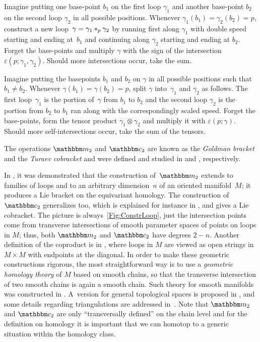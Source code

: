 \documentclass[\MainFolder/Text.tex]{subfiles}
\begin{document}
\begin{description}[leftmargin=*]
 \item[$\StringOp_2$:] Imagine putting one base-point $b_1$ on the first loop $\gamma_1$ and another base-point $b_2$ on the second loop $\gamma_2$ in all possible positions. Whenever $\gamma_1(b_1) = \gamma_2(b_2) = p$, construct a new loop~$\gamma = \gamma_1 *_p \gamma_2$ by running first along $\gamma_1$ with double speed starting and ending at~$b_1$ and continuing along $\gamma_2$ starting and ending at $b_2$. Forget the base-points and multiply $\gamma$ with the sign of the intersection $\varepsilon(p;\gamma_1, \gamma_2)$. Should more intersections occur, take the sum.
 \item[$\StringCoOp_2$:] Imagine putting the basepoints $b_1$ and $b_2$ on $\gamma$ in all possible positions such that $b_1 \neq b_2$. Whenever $\gamma(b_1) = \gamma(b_2)=p$, split $\gamma$ into~$\gamma_1$ and $\gamma_2$ as follows. The first loop~$\gamma_1$ is the portion of~$\gamma$ from $b_1$ to $b_2$ and the second loop $\gamma_2$ is the portion from $b_2$ to $b_1$ ran along with the correspondingly scaled speed. Forget the base-points, form the tensor product $\gamma_1 \otimes \gamma_2$ and multiply it with $\varepsilon(p; \gamma)$. Should more self-intersections occur, take the sum of the tensors.
\end{description}
The operations $\StringOp_2$ and $\StringCoOp_2$ are known as the \emph{Goldman bracket} and the \emph{Turaev cobracket} and were defined and studied in \cite{Goldman1986} and \cite{Turaev1991}, respectively.

In \cite{Sullivan1999}, it was demonstrated that the construction of~$\StringOp_2$ extends to families of loops and to an arbitrary dimension~$n$ of an oriented manifold~$M$; it produces a Lie bracket on the equivariant homology. The construction of $\StringCoOp_2$ generalizes too, which is explained for instance in \cite{Cieliebak2007}, and gives a Lie cobracket. The picture is always~\ref{Fig:ConstrLoop}, just the intersection points come from transverse intersections of smooth parameter spaces of points on loops in $M$; thus, both $\StringOp_2$ and $\StringCoOp_2$ have degrees $2-n$. Another definition of the coproduct is in \cite{Basu2011}, where loops in $M$ are viewed as open strings in $M\times M$ with endpoints at the diagonal. In order to make these geometric constructions rigorous, the most straightforward way is to use a \emph{geometric homology theory} of $M$ based on smooth chains, so that the transverse intersection of two smooth chains is again a smooth chain. Such theory for smooth manifolds was constructed in \cite{Lipyanskiy2014}. A~version for general topological spaces is proposed in \cite{Cieliebak2013}, and some details regarding triangulations are addressed in~\cite{Hajek2014}. Note that $\StringOp_2$ and $\StringCoOp_2$ are only ``transversally defined'' on the chain level and for the definition on homology it is important that we can homotop to a generic situation within the homology class.
\end{document}
